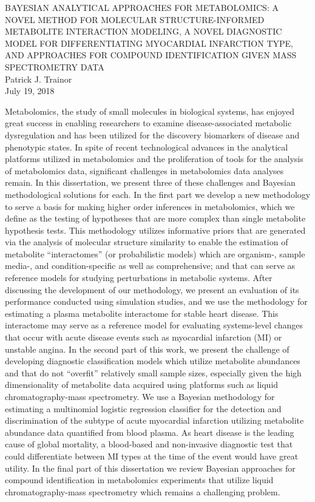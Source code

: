 \documentclass[final]{ulthesis}
\begin{document}
\begin{dissertationabstract}
\begin{center}
	BAYESIAN ANALYTICAL APPROACHES FOR METABOLOMICS: A NOVEL METHOD FOR MOLECULAR STRUCTURE-INFORMED METABOLITE INTERACTION MODELING, A NOVEL DIAGNOSTIC MODEL FOR DIFFERENTIATING MYOCARDIAL INFARCTION TYPE, AND APPROACHES FOR COMPOUND IDENTIFICATION GIVEN MASS SPECTROMETRY DATA \\
	Patrick J. Trainor \\
	July 19, 2018
\end{center}
Metabolomics, the study of small molecules in biological systems, has enjoyed great success in enabling researchers to examine disease-associated metabolic dysregulation and has been utilized for the discovery biomarkers of disease and phenotypic states. In spite of recent technological advances in the analytical platforms utilized in metabolomics and the proliferation of tools for the analysis of metabolomics data, significant challenges in metabolomics data analyses remain. In this dissertation, we present three of these challenges and Bayesian methodological solutions for each. In the first part we develop a new methodology to serve a basis for making higher order inferences in metabolomics, which we define as the testing of hypotheses that are more complex than single metabolite hypothesis tests. This methodology utilizes informative priors that are generated via the analysis of molecular structure similarity to enable the estimation of metabolite ``interactomes'' (or probabilistic models) which are organism-, sample media-, and condition-specific as well as comprehensive; and that can serve as reference models for studying perturbations in metabolic systems. After discussing the development of our methodology, we present an evaluation of its performance conducted using simulation studies, and we use the methodology for estimating a plasma metabolite interactome for stable heart disease. This interactome may serve as a reference model for evaluating systems-level changes that occur with acute disease events such as myocardial infarction (MI) or unstable angina. In the second part of this work, we present the challenge of developing diagnostic classification models which utilize metabolite abundances and that do not ``overfit'' relatively small sample sizes, especially given the high dimensionality of metabolite data acquired using platforms such as liquid chromatography-mass spectrometry. We use a Bayesian methodology for estimating a multinomial logistic regression classifier for the detection and discrimination of the subtype of acute myocardial infarction utilizing metabolite abundance data quantified from blood plasma. As heart disease is the leading cause of global mortality, a blood-based and non-invasive diagnostic test that could differentiate between MI types at the time of the event would have great utility. In the final part of this dissertation we review Bayesian approaches for compound identification in metabolomics experiments that utilize liquid chromatography-mass spectrometry which remains a challenging problem.
\end{dissertationabstract}
\end{document}

